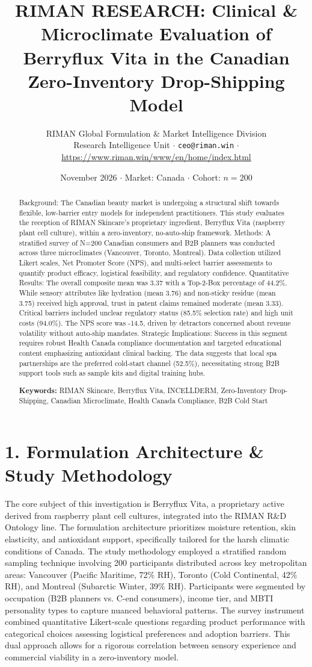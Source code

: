 \documentclass[10pt,twocolumn,a4paper]{article}
\title{\textbf{RIMAN RESEARCH: Clinical \& Microclimate Evaluation of Berryflux Vita in the Canadian Zero-Inventory Drop-Shipping Model}}
\author{RIMAN Global Formulation \& Market Intelligence Division\\
\small Research Intelligence Unit $\cdot$ \texttt{ceo@riman.win} $\cdot$ \url{https://www.riman.win/www/en/home/index.html}}
\date{November 2026 \quad $\cdot$ \quad Market: Canada \quad $\cdot$ \quad Cohort: $n = 200$}
\begin{document}
\maketitle

\begin{abstract}
Background: The Canadian beauty market is undergoing a structural shift towards flexible, low-barrier entry models for independent practitioners. This study evaluates the reception of RIMAN Skincare’s proprietary ingredient, Berryflux Vita (raspberry plant cell culture), within a zero-inventory, no-auto-ship framework. Methods: A stratified survey of N=200 Canadian consumers and B2B planners was conducted across three microclimates (Vancouver, Toronto, Montreal). Data collection utilized Likert scales, Net Promoter Score (NPS), and multi-select barrier assessments to quantify product efficacy, logistical feasibility, and regulatory confidence. Quantitative Results: The overall composite mean was 3.37 with a Top-2-Box percentage of 44.2\%. While sensory attributes like hydration (mean 3.76) and non-sticky residue (mean 3.75) received high approval, trust in patent claims remained moderate (mean 3.33). Critical barriers included unclear regulatory status (85.5\% selection rate) and high unit costs (94.0\%). The NPS score was -14.5, driven by detractors concerned about revenue volatility without auto-ship mandates. Strategic Implications: Success in this segment requires robust Health Canada compliance documentation and targeted educational content emphasizing antioxidant clinical backing. The data suggests that local spa partnerships are the preferred cold-start channel (52.5\%), necessitating strong B2B support tools such as sample kits and digital training hubs.

\vspace{0.4em}
\noindent\textbf{Keywords:} RIMAN Skincare, Berryflux Vita, INCELLDERM, Zero-Inventory Drop-Shipping, Canadian Microclimate, Health Canada Compliance, B2B Cold Start
\end{abstract}

\section{1. Formulation Architecture \& Study Methodology}
The core subject of this investigation is Berryflux Vita, a proprietary active derived from raspberry plant cell cultures, integrated into the RIMAN R\&D Ontology line. The formulation architecture prioritizes moisture retention, skin elasticity, and antioxidant support, specifically tailored for the harsh climatic conditions of Canada. The study methodology employed a stratified random sampling technique involving 200 participants distributed across key metropolitan areas: Vancouver (Pacific Maritime, 72\% RH), Toronto (Cold Continental, 42\% RH), and Montreal (Subarctic Winter, 39\% RH). Participants were segmented by occupation (B2B planners vs. C-end consumers), income tier, and MBTI personality types to capture nuanced behavioral patterns. The survey instrument combined quantitative Likert-scale questions regarding product performance with categorical choices assessing logistical preferences and adoption barriers. This dual approach allows for a rigorous correlation between sensory experience and commercial viability in a zero-inventory model.
\end{document}
